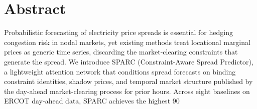 \section{Abstract}
Probabilistic forecasting of electricity price spreads is essential for hedging congestion risk in nodal markets, yet existing methods treat locational marginal prices as generic time series, discarding the market-clearing constraints that generate the spread. We introduce SPARC (Constraint-Aware Spread Predictor), a lightweight attention network that conditions spread forecasts on binding constraint identities, shadow prices, and temporal market structure published by the day-ahead market-clearing process for prior hours. Across eight baselines on ERCOT day-ahead data, SPARC achieves the highest 90%
